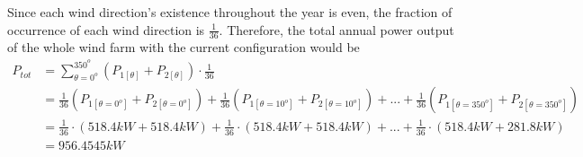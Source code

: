 Since each wind direction's existence throughout the year is even, the fraction of occurrence of each wind direction is $\frac{1}{36}$. Therefore, the total annual power output of the whole wind farm with the current configuration would be
\begin{align*}
    P_{tot}
    &= \sum_{\theta=0^o}^{350^o} \left( P_{1[\theta]} + P_{2[\theta]} \right) \cdot \frac{1}{36} \\
    &= \frac{1}{36}\left( P_{1[\theta=0^o]} + P_{2[\theta=0^o]} \right) + \frac{1}{36}\left( P_{1[\theta=10^o]} + P_{2[\theta=10^o]} \right) +...+ \frac{1}{36}\left( P_{1[\theta=350^o]} + P_{2[\theta=350^o]} \right) \\
    &= \frac{1}{36}\cdot\left( 518.4kW + 518.4kW \right) + \frac{1}{36}\cdot\left( 518.4kW + 518.4kW \right) +...+ \frac{1}{36}\cdot\left( 518.4kW + 281.8kW \right) \\
    &=956.4545kW
\end{align*}